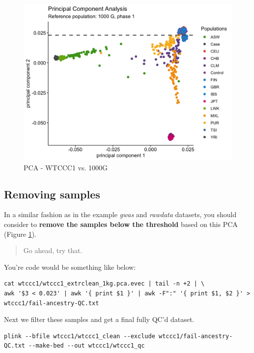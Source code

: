 \documentclass[
]{book}
\begin{document}
\begin{figure}[H]

{\centering \includegraphics[width=0.85\linewidth]{img/_gwas_wtccc/WTCCC1-pca-1000g} 

}

\caption{PCA - WTCCC1 vs. 1000G}\label{fig:showwtccc1pca}
\end{figure}

\hypertarget{removing-samples-1}{%
\subsection{Removing samples}\label{removing-samples-1}}

In a similar fashion as in the example \emph{gwas} and \emph{rawdata} datasets, you should consider to \textbf{remove the samples below the threshold} based on this PCA (Figure \ref{fig:showwtccc1pca}).

\begin{quote}
Go ahead, try that.
\end{quote}

You're code would be something like below:

\begin{lstlisting}
cat wtccc1/wtccc1_extrclean_1kg.pca.evec | tail -n +2 | \
awk '$3 < 0.023' | awk '{ print $1 }' | awk -F":" '{ print $1, $2 }' > wtccc1/fail-ancestry-QC.txt
\end{lstlisting}

Next we filter these samples and get a final fully QC'd dataset.

\begin{lstlisting}
plink --bfile wtccc1/wtccc1_clean --exclude wtccc1/fail-ancestry-QC.txt --make-bed --out wtccc1/wtccc1_qc
\end{lstlisting}
\end{document}
